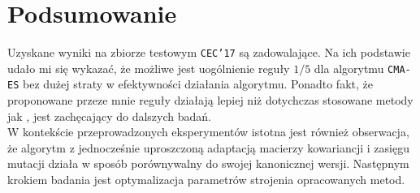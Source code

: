 \section{Podsumowanie}
\label{section:podsumowanie}

Uzyskane wyniki na zbiorze testowym \texttt{CEC'17} są zadowalające. Na ich podstawie udało mi się wykazać, że możliwe jest uogólnienie reguły $1/5$ dla algorytmu \texttt{CMA-ES} bez dużej straty w efektywności działania algorytmu. Ponadto fakt, że proponowane przeze mnie reguły działają lepiej niż dotychczas stosowane metody jak \cite{Elhara13}, jest zachęcający do dalszych badań. \\ 
\indent W kontekście przeprowadzonych eksperymentów istotna jest również obserwacja, że algorytm z jednocześnie uproszczoną adaptacją macierzy kowariancji i zasięgu mutacji działa w sposób porównywalny do swojej kanonicznej wersji. Następnym krokiem badania jest optymalizacja parametrów strojenia opracowanych metod.
